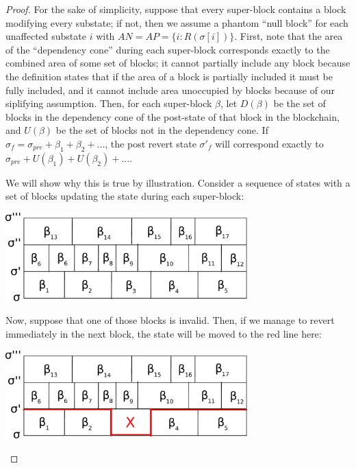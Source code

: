 \documentclass[11pt,a4paper]{report}
\theoremstyle{plain}
\theoremstyle{definition}
\theoremstyle{remark}
\begin{document}
\begin{proof}
For the sake of simplicity, suppose that every super-block contains a block modifying every substate; if not, then we assume a phantom ``null block'' for each unaffected substate $i$ with $AN = AP = \{i: R(\sigma[i])\}$. First, note that the area of the ``dependency cone'' during each super-block corresponds exactly to the combined area of some set of blocks; it cannot partially include any block because the definition states that if the area of a block is partially included it must be fully included, and it cannot include area unoccupied by blocks because of our siplifying assumption. Then, for each super-block $\beta$, let $D(\beta)$ be the set of blocks in the dependency cone of the post-state of that block in the blockchain, and $U(\beta)$ be the set of blocks not in the dependency cone. If $\sigma_f = \sigma_{pre} + \beta_1 + \beta_2 + ...$, the post revert state $\sigma'_f$ will correspond exactly to $\sigma_{pre} + U(\beta_1) + U(\beta_2) + ...$. 

We will show why this is true by illustration. Consider a sequence of states with a set of blocks updating the state during each super-block:

\begin{center}
\includegraphics[width=0.7\textwidth]{figs/pdfs/revert1.pdf}
\end{center}

Now, suppose that one of those blocks is invalid. Then, if we manage to revert immediately in the next block, the state will be moved to the red line here:

\begin{center}
\includegraphics[width=0.7\textwidth]{figs/pdfs/revert2.pdf}
\end{center}


\end{proof}
\end{document}

